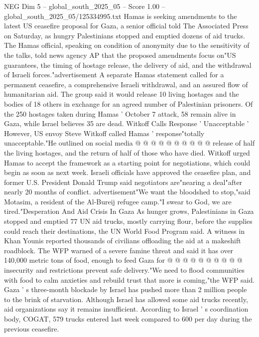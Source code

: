 \begin{textsample}{NEG Dim 5 – global\_south\_2025\_05 – Score 1.00 – global\_south\_2025\_05/125334995.txt}  \label{ex:f5_neg_334}
Hamas is seeking amendments to the latest US ceasefire proposal for Gaza, a senior official told The Associated Press on Saturday, as hungry Palestinians stopped and emptied dozens of aid trucks.
The Hamas official, speaking on condition of anonymity due to the sensitivity of the talks, told news agency AP that the proposed amendments focus on"US guarantees, the timing of hostage release, the delivery of aid, and the withdrawal of Israeli forces."advertisement A separate Hamas statement called for a permanent ceasefire, a comprehensive Israeli withdrawal, and an assured flow of humanitarian aid.
The group said it would release 10 living hostages and the bodies of 18 others in exchange for an agreed number of Palestinian prisoners.
Of the 250 hostages taken during Hamas ' October 7 attack, 58 remain alive in Gaza, while Israel believes 35 are dead.
Witkoff Calls Response ' Unacceptable ' However, US envoy Steve Witkoff called Hamas ' response"totally unacceptable."He outlined on social media @ @ @ @ @ @ @ @ @ @ release of half the living hostages, and the return of half of those who have died.
Witkoff urged Hamas to accept the framework as a starting point for negotiations, which could begin as soon as next week.
Israeli officials have approved the ceasefire plan, and former U.S.
President Donald Trump said negotiators are"nearing a deal"after nearly 20 months of conflict. advertisement"We want the bloodshed to stop,"said Motasim, a resident of the Al-Bureij refugee camp."I swear to God, we are tired."Desperation And Aid Crisis In Gaza As hunger grows, Palestinians in Gaza stopped and emptied 77 UN aid trucks, mostly carrying flour, before the supplies could reach their destinations, the UN World Food Program said.
A witness in Khan Younis reported thousands of civilians offloading the aid at a makeshift roadblock.
The WFP warned of a severe famine threat and said it has over 140,000 metric tons of food, enough to feed Gaza for @ @ @ @ @ @ @ @ @ @ insecurity and restrictions prevent safe delivery."We need to flood communities with food to calm anxieties and rebuild trust that more is coming,"the WFP said.
Gaza ' s three-month blockade by Israel has pushed more than 2 million people to the brink of starvation.
Although Israel has allowed some aid trucks recently, aid organizations say it remains insufficient.
According to Israel ' s coordination body, COGAT, 579 trucks entered last week compared to 600 per day during the previous ceasefire.

\end{textsample}
